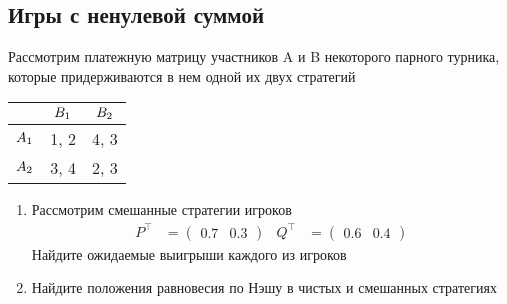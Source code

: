 \subsection{Игры с ненулевой суммой}

\begin{exercise}
Рассмотрим платежную матрицу участников A и B некоторого парного турника,
которые придерживаются в нем одной их двух стратегий
\begin{center}
	\begin{tabular}{|c||c|c|}
	\hline
	& $B_{1}$ & $B_{2}$  \\ \hline \hline
	$A_1$ & 1, 2 & 4, 3  \\ \hline
	$A_2$ & 3, 4 & 2, 3  \\ %
	\hline
	\end{tabular}
\end{center}
\begin{enumerate}
	\item Рассмотрим  смешанные стратегии игроков 
	\begin{align*}
		P^\top&=\begin{pmatrix} 0.7 & 0.3 \end{pmatrix} &
		Q^\top&=\begin{pmatrix} 0.6 & 0.4 \end{pmatrix}
	\end{align*}
	Найдите ожидаемые выигрыши каждого из игроков
	\item Найдите положения равновесия по Нэшу в чистых и смешанных стратегиях
\end{enumerate}
\end{exercise}

